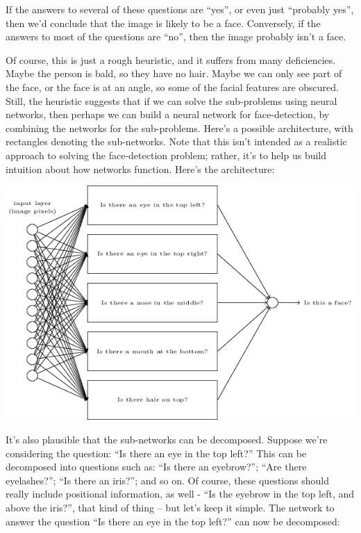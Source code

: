 \documentclass[a4paper,twoside,10pt]{book}
\begin{document}
If the answers to several of these questions are ``yes'', or even just ``probably yes'', then we'd conclude that the image is likely to be a face. Conversely, if the answers to most of the questions are ``no'', then the image probably isn't a face.

Of course, this is just a rough heuristic, and it suffers from many deficiencies. Maybe the person is bald, so they have no hair. Maybe we can only see part of the face, or the face is at an angle, so some of the facial features are obscured. Still, the heuristic suggests that if we can solve the sub-problems using neural networks, then perhaps we can build a neural network for face-detection, by combining the networks for the sub-problems. Here's a possible architecture, with rectangles denoting the sub-networks. Note that this isn't intended as a realistic approach to solving the face-detection problem; rather, it's to help us build intuition about how networks function. Here's the architecture:

\begin{center}
	\includegraphics[scale=0.5]{./figures/ch1/tikz14}
\end{center}
It's also plausible that the sub-networks can be decomposed. Suppose we're considering the question: ``Is there an eye in the top left?'' This can be decomposed into questions such as: ``Is there an eyebrow?''; ``Are there eyelashes?''; ``Is there an iris?''; and so on. Of course, these questions should really include positional information, as well - ``Is the eyebrow in the top left, and above the iris?'', that kind of thing -- but let's keep it simple. The network to answer the question ``Is there an eye in the top left?'' can now be decomposed:
\end{document}
